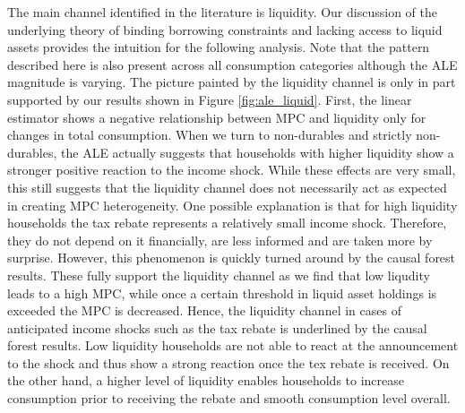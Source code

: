 The main channel identified in the literature is liquidity. Our discussion of the underlying theory of binding borrowing constraints and lacking access to liquid assets provides the intuition for the following analysis. Note that the pattern described here is also present across all consumption categories although the ALE magnitude is varying. The picture painted by the liquidity channel is only in part supported by our results shown in Figure \ref{fig:ale_liquid}. First, the linear estimator shows a negative relationship between MPC and liquidity only for changes in total consumption. When we turn to non-durables and strictly non-durables, the ALE actually suggests that households with higher liquidity show a stronger positive reaction to the income shock. While these effects are very small, this still suggests that the liquidity channel does not necessarily act as expected in creating MPC heterogeneity. One possible explanation is that for high liquidity households the tax rebate represents a relatively small income shock. Therefore, they do not depend on it financially, are less informed and are taken more by surprise. However, this phenomenon is quickly turned around by the causal forest results. These fully support the liquidity channel as we find that low liqudity leads to a high MPC, while once a certain threshold in liquid asset holdings is exceeded the MPC is decreased. Hence, the liquidity channel in cases of anticipated income shocks such as the tax rebate is underlined by the causal forest results. Low liquidity households are not able to react at the announcement to the shock and thus show a strong reaction once the tex rebate is received. On the other hand, a higher level of liquidity enables households to increase consumption prior to receiving the rebate and smooth consumption level overall. \\
